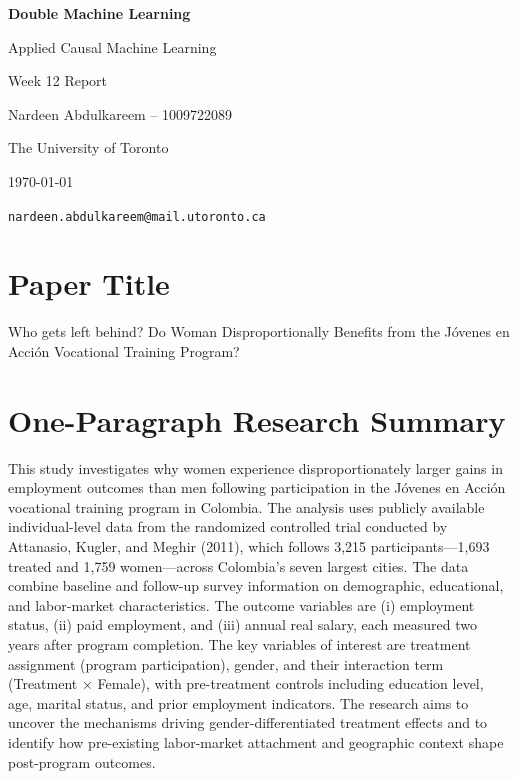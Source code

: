 \documentclass[12pt]{article}
\begin{document}
\begin{titlepage}
    \thispagestyle{empty} %
    \centering
    \vspace*{\fill}

    {\Large \textbf{Double Machine Learning} \par}
    \vspace{0.5em}
    {\normalsize Applied Causal Machine Learning \par}
    {\normalsize Week 12 Report \par}

    \vspace{3em}
    {\large Nardeen Abdulkareem -- 1009722089 \par}
    {\normalsize The University of Toronto \par}
    {\normalsize \today \par}
    {\texttt{nardeen.abdulkareem@mail.utoronto.ca} \par}

    \vspace*{\fill}
\end{titlepage}
\clearpage

\section{Paper Title}
Who gets left behind? Do Woman Disproportionally Benefits from the Jóvenes en Acción Vocational Training Program?

\section{One-Paragraph Research Summary}

This study investigates why women experience disproportionately larger gains in employment outcomes than men following participation in the Jóvenes en Acción vocational training program in Colombia. The analysis uses publicly available individual-level data from the randomized controlled trial conducted by Attanasio, Kugler, and Meghir (2011), which follows 3,215 participants—1,693 treated and 1,759 women—across Colombia’s seven largest cities. The data combine baseline and follow-up survey information on demographic, educational, and labor-market characteristics. The outcome variables are (i) employment status, (ii) paid employment, and (iii) annual real salary, each measured two years after program completion. The key variables of interest are treatment assignment (program participation), gender, and their interaction term (Treatment × Female), with pre-treatment controls including education level, age, marital status, and prior employment indicators. The research aims to uncover the mechanisms driving gender-differentiated treatment effects and to identify how pre-existing labor-market attachment and geographic context shape post-program outcomes.
\end{document}
